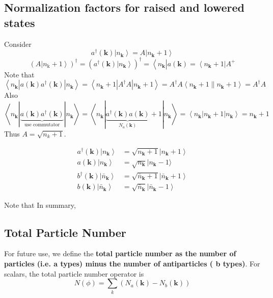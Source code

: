 \subsection{Normalization factors for raised and lowered states}
Consider
$$
a^{\dagger}(\mathbf{k})\left|n_{\mathbf{k}}\right\rangle= A\left|n_{\mathbf{k}}+1\right\rangle
$$
$$
\left(A\left|n_{\mathrm{k}}+1\right\rangle\right)^{\dagger}=\left(a^{\dagger}(\mathbf{k})\left|n_{\mathbf{k}}\right\rangle\right)^{\dagger}=\left\langle n_{\mathbf{k}}\left|a(\mathbf{k})=\left\langle n_{\mathbf{k}}+1\right| A^{+}\right.\right.
$$
Note that
$$
\left\langle n_{\mathbf{k}}\left|a(\mathbf{k}) a^{\dagger}(\mathbf{k})\right| n_{\mathbf{k}}\right\rangle=\left\langle n_{\mathbf{k}}+1\left|A^{\dagger} A\right| n_{\mathbf{k}}+1\right\rangle= A^{\dagger} A\left\langle n_{\mathbf{k}}+1 \| n_{\mathbf{k}}+1\right\rangle= A^{\dagger} A
$$
Also
$$
\left\langle n_{\mathbf{k}}\left|\underbrace{a(\mathbf{k}) a^{\dagger}(\mathbf{k})}_{\text { use commutator }}\right| n_{\mathbf{k}}\right\rangle=\left\langle n_{\mathbf{k}}|\underbrace{a^{\dagger}(\mathbf{k}) a(\mathbf{k})}_{N_{a}(\mathbf{k})}+1| n_{\mathbf{k}}\right\rangle=\left\langle n_{\mathbf{k}}\left|n_{\mathbf{k}}+1\right| n_{\mathbf{k}}\right\rangle= n_{\mathbf{k}}+1
$$
Thus $A=\sqrt{n_{k}+1}$.
\begin{qt}
    \begin{equation}
\begin{aligned}
a^{\dagger}(\mathbf{k})\left|n_{\mathbf{k}}\right\rangle &=\sqrt{n_{\mathbf{k}}+1}\left|n_{\mathbf{k}}+1\right\rangle \\
a(\mathbf{k})\left|n_{\mathbf{k}}\right\rangle &=\sqrt{n_{\mathbf{k}}} | n_{\mathbf{k}}-1\rangle \\
b^{\dagger}(\mathbf{k})\left|\bar{n}_{\mathbf{k}}\right\rangle &=\sqrt{\bar{n}_{\mathbf{k}}+1}\left|\bar{n}_{\mathbf{k}}+1\right\rangle \\
b(\mathbf{k})\left|\bar{n}_{\mathbf{k}}\right\rangle &=\sqrt{\bar{n}_{\mathbf{k}}}\left|\bar{n}_{\mathbf{k}}-1\right\rangle
\end{aligned}
\end{equation}
\end{qt}
Note that  In summary, 

\subsection{Total Particle Number}
For future use, we define the \textbf{total particle number as the number of particles (i.e. a types) minus the number of antiparticles ( b types)}. For scalars, the total particle number operator is
\begin{equation}
    N(\phi)=\sum_{k}\left(N_{a}(\mathbf{k})-N_{b}(\mathbf{k})\right)
\end{equation}
